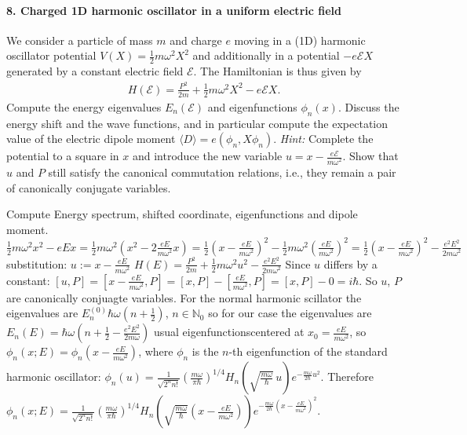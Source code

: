 \documentclass[11pt,a4paper]{scrartcl}
\begin{document}
\paragraph{8. Charged 1D harmonic oscillator in a uniform electric field} We consider a particle of mass $m$ and charge $e$ moving in a (1D) harmonic oscillator potential $V(X) = \frac{1}{2} m \omega^2 X^2$ and additionally in a potential $-e\mathcal{E}X$ generated by a constant electric field $\mathcal{E}$. The Hamiltonian is thus given by \begin{align*} H(\mathcal{E}) = \frac{P^2}{2m} + \frac{1}{2} m \omega^2 X^2 - e\mathcal{E}X. \end{align*} Compute the energy eigenvalues $E_n(\mathcal{E})$ and eigenfunctions $\phi_n(x)$. Discuss the energy shift and the wave functions, and in particular compute the expectation value of the electric dipole moment $\langle D \rangle = e(\phi_n, X \phi_n)$. \textit{Hint:} Complete the potential to a square in $x$ and introduce the new variable $u = x - \frac{e\mathcal{E}}{m\omega^2}$. Show that $u$ and $P$ still satisfy the canonical commutation relations, i.e., they remain a pair of canonically conjugate variables. \begin{calculationbox} Compute Energy spectrum, shifted coordinate, eigenfunctions and dipole moment. $\frac{1}{2}m\omega^2 x^2 - eEx = \frac{1}{2}m\omega^2 \left(x^2 - 2 \frac{eE}{m\omega^2}x\right) = \frac{1}{2} \left( x - \frac{eE}{m\omega^2}\right)^2 - \frac{1}{2}m\omega^2 \left( \frac{eE}{m\omega^2}\right)^2 = \frac{1}{2} \left( x - \frac{eE}{m\omega^2}\right)^2 - \frac{e^2E^2}{2m\omega^2}$ substitution: $u := x - \frac{eE}{m\omega^2}$ $H(E) = \frac{P^2}{2m} + \frac{1}{2} m\omega^2 u^2 - \frac{e^2 E^2}{2 m \omega^2}$ Since $u$ differs by a constant: $[u,P] = [x - \frac{eE}{m\omega^2}, P] = [x,P] - [\frac{eE}{m\omega^2},P] = [x,P] - 0 = i\hbar$. So $u$, $P$ are canonically conjuagte variables. For the normal harmonic scillator the eigenvalues are $E_n^{(0)} \hbar \omega(n + \frac{1}{2})$, $n\in \mathbb{N}_0$ so for our case the eigenvalues are $E_n(E) = \hbar \omega (n + \frac{1}{2} - \frac{e^2E^2}{2m\omega})$ usual eigenfunctionscentered at $x_0=\frac{eE}{m\omega^2}$, so $\phi_n(x;E)=\phi_n\!\left(x-\frac{eE}{m\omega^2}\right)$, where $\phi_n$ is the $n$-th eigenfunction of the standard harmonic oscillator: $\phi_n(u)=\frac{1}{\sqrt{2^n n!}}\left(\frac{m\omega}{\pi\hbar}\right)^{1/4}H_n\left(\sqrt{\frac{m\omega}{\hbar}}\,u\right)e^{-\frac{m\omega}{2\hbar}u^2}$. Therefore $\phi_n(x;E)=\frac{1}{\sqrt{2^n n!}}\left(\frac{m\omega}{\pi\hbar}\right)^{1/4}H_n\left(\sqrt{\frac{m\omega}{\hbar}}\left(x-\frac{eE}{m\omega^2}\right)\right) e^{-\frac{m\omega}{2\hbar}\left(x-\frac{eE}{m\omega^2}\right)^2}$. \end{calculationbox}
\end{document}
